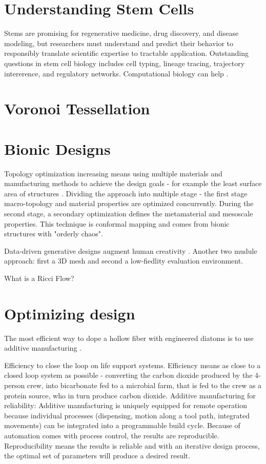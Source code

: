 \documentclass[a4paper,11pt]{article}
\begin{document}
\section{Understanding Stem Cells}

Stems are promising for regenerative medicine, drug discovery, and disease modeling, but researchers must understand and predict their behavior to responsibly translate scientific expertise to tractable application. Outstanding questions in stem cell biology includes cell typing, lineage tracing, trajectory intererence, and regulatory networks. Computational biology can help \cite{cahan2021computational}.

\section{Voronoi Tessellation}




\section{Bionic Designs}

Topology optimization increasing means using multiple materials and manufacturing methods to achieve the design goals - for example the least surface area of structures \cite{jiang2021generative}. Dividing the approach into multiple stage - the first stage macro-topology and material properties are optimized concurrently. During the second stage, a secondary optimization defines the metamaterial and mesoscale properties. This technique is conformal mapping and comes from bionic structures with "orderly chaos".

Data-driven generative designs augment human creativity \cite{li2021part}. Another two mudule approach: first a 3D mesh
and second a low-fiedlity evaluation environment.

What is a Ricci Flow?

\section{Optimizing design}

The most efficient way to dope a hollow fiber with engineered diatoms is to use additive manufacturing \cite{dalwadi2015understanding}.

Efficiency to close the loop on life support systems. Efficiency means as close to a closed loop system as possible - converting the carbon dioxide produced by the 4-person crew, into bicarbonate fed to a microbial farm, that is fed to the crew as a protein source, who in turn produce carbon dioxide.
Additive manufacturing for reliability: Additive manufacturing is uniquely equipped for remote operation because individual processes (dispensing, motion along a tool path, integrated movements) can be integrated into a programmable build cycle. Because of automation comes with process control, the results are reproducible. Reproducibility means the results is reliable and with an iterative design process, the optimal set of parameters will produce a desired result.
\end{document}
